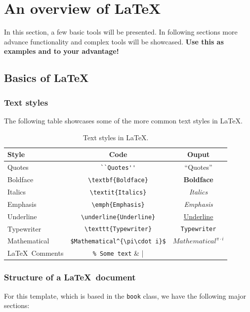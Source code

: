 \chapter{An overview of \LaTeX}

In this section, a few basic tools will be presented. In following sections more advance functionality and complex tools will be showcased. \textbf{Use this as examples and to your advantage!}

\section{Basics of \LaTeX}

\subsection{Text styles}

The following table showcases some of the more common text styles in \LaTeX.

\begin{table}[h]
	\centering
	\begin{tabular}{lcc}
	  \toprule
	  Style & Code & Ouput \\
	  \midrule
	  Quotes & \verb|``Quotes''| & ``Quotes'' \\
	  Boldface & \verb|\textbf{Boldface}| & \textbf{Boldface} \\
	  Italics & \verb|\textit{Italics}| & \textit{Italics} \\
	  Emphasis & \verb|\emph{Emphasis}| & \emph{Emphasis} \\
	  Underline & \verb|\underline{Underline}| & \underline{Underline} \\
	  Typewriter & \verb|\texttt{Typewriter}| & \texttt{Typewriter} \\
	  Mathematical & \verb|$Mathematical^{\pi\cdot i}$| & $Mathematical^{\pi\cdot i}$ \\
	  \LaTeX\ Comments & \verb|% Some text| & %
	  \\
	  \bottomrule
	\end{tabular}
	\caption{Text styles in \LaTeX.}
	\label{fig:textstyles}
\end{table}

\subsection{Structure of a \LaTeX\ document}

For this template, which is based in the \texttt{book} class, we have the following major sections:

